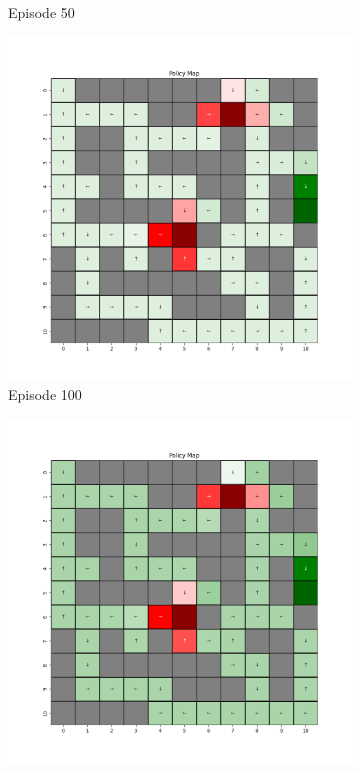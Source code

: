 \documentclass{assignment}
\begin{document}
\begin{figure}[H]
\begin{subfigure}{0.3\textwidth}
    \caption{Episode 50}
    \end{subfigure}\hfill
    \begin{subfigure}{0.3\textwidth}
        \includegraphics[width=\textwidth]{figures/policy_td/gamma_sweep/policy_alpha_0.1_gamma_0.25_epsilon_0.2_iteration_100.png}
    \caption{Episode 100}
    \end{subfigure}
    \begin{subfigure}{0.3\textwidth}
        \includegraphics[width=\textwidth]{figures/policy_td/gamma_sweep/policy_alpha_0.1_gamma_0.25_epsilon_0.2_iteration_1000.png}

\end{subfigure}
\end{figure}
\end{document}
